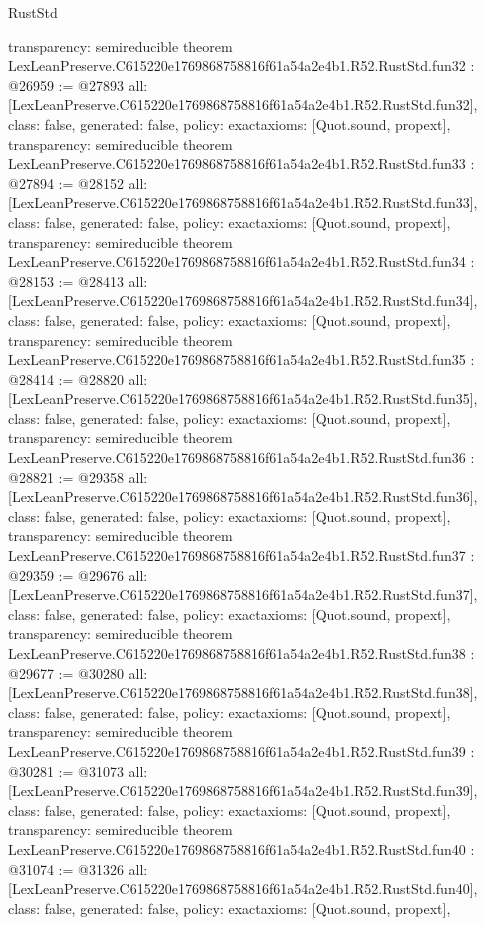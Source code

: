 \begin{lexlean}{RustStd}
\begin{coremodule}
{  transparency: semireducible
}
theorem LexLeanPreserve.C615220e1769868758816f61a54a2e4b1.R52.RustStd.fun32 : @26959 := @27893 {
  all: [LexLeanPreserve.C615220e1769868758816f61a54a2e4b1.R52.RustStd.fun32],
  class: false,
  generated: false,
  policy: exact{axioms: [Quot.sound, propext]},
  transparency: semireducible
}
theorem LexLeanPreserve.C615220e1769868758816f61a54a2e4b1.R52.RustStd.fun33 : @27894 := @28152 {
  all: [LexLeanPreserve.C615220e1769868758816f61a54a2e4b1.R52.RustStd.fun33],
  class: false,
  generated: false,
  policy: exact{axioms: [Quot.sound, propext]},
  transparency: semireducible
}
theorem LexLeanPreserve.C615220e1769868758816f61a54a2e4b1.R52.RustStd.fun34 : @28153 := @28413 {
  all: [LexLeanPreserve.C615220e1769868758816f61a54a2e4b1.R52.RustStd.fun34],
  class: false,
  generated: false,
  policy: exact{axioms: [Quot.sound, propext]},
  transparency: semireducible
}
theorem LexLeanPreserve.C615220e1769868758816f61a54a2e4b1.R52.RustStd.fun35 : @28414 := @28820 {
  all: [LexLeanPreserve.C615220e1769868758816f61a54a2e4b1.R52.RustStd.fun35],
  class: false,
  generated: false,
  policy: exact{axioms: [Quot.sound, propext]},
  transparency: semireducible
}
theorem LexLeanPreserve.C615220e1769868758816f61a54a2e4b1.R52.RustStd.fun36 : @28821 := @29358 {
  all: [LexLeanPreserve.C615220e1769868758816f61a54a2e4b1.R52.RustStd.fun36],
  class: false,
  generated: false,
  policy: exact{axioms: [Quot.sound, propext]},
  transparency: semireducible
}
theorem LexLeanPreserve.C615220e1769868758816f61a54a2e4b1.R52.RustStd.fun37 : @29359 := @29676 {
  all: [LexLeanPreserve.C615220e1769868758816f61a54a2e4b1.R52.RustStd.fun37],
  class: false,
  generated: false,
  policy: exact{axioms: [Quot.sound, propext]},
  transparency: semireducible
}
theorem LexLeanPreserve.C615220e1769868758816f61a54a2e4b1.R52.RustStd.fun38 : @29677 := @30280 {
  all: [LexLeanPreserve.C615220e1769868758816f61a54a2e4b1.R52.RustStd.fun38],
  class: false,
  generated: false,
  policy: exact{axioms: [Quot.sound, propext]},
  transparency: semireducible
}
theorem LexLeanPreserve.C615220e1769868758816f61a54a2e4b1.R52.RustStd.fun39 : @30281 := @31073 {
  all: [LexLeanPreserve.C615220e1769868758816f61a54a2e4b1.R52.RustStd.fun39],
  class: false,
  generated: false,
  policy: exact{axioms: [Quot.sound, propext]},
  transparency: semireducible
}
theorem LexLeanPreserve.C615220e1769868758816f61a54a2e4b1.R52.RustStd.fun40 : @31074 := @31326 {
  all: [LexLeanPreserve.C615220e1769868758816f61a54a2e4b1.R52.RustStd.fun40],
  class: false,
  generated: false,
  policy: exact{axioms: [Quot.sound, propext]},
}
\end{coremodule}
\end{lexlean}
